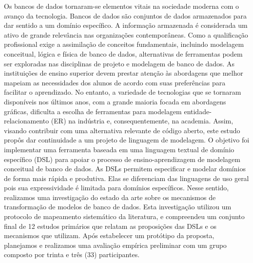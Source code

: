 \begin{resumo}[Resumo]
Os bancos de dados tornaram-se elementos vitais na sociedade moderna com o avanço da tecnologia.
Bancos de dados são conjuntos de dados armazenados para dar sentido a um domínio específico.
A informação armazenada é considerada um ativo de grande relevância nas organizações contemporâneas.
Como a qualificação profissional exige a assimilação de conceitos fundamentais, incluindo modelagem conceitual, lógica e física de banco de dados, alternativas de ferramentas podem ser exploradas nas disciplinas de projeto e modelagem de banco de dados.
As instituições de ensino superior devem prestar atenção às abordagens que melhor mapeiam as necessidades dos alunos de acordo com suas preferências para facilitar o aprendizado.
No entanto, a variedade de tecnologias que se tornaram disponíveis nos últimos anos, com a grande maioria focada em abordagens gráficas, dificulta a escolha de ferramentas para modelagem entidade-relacionamento (ER) na indústria e, consequentemente, na academia.
Assim, visando contribuir com uma alternativa relevante de código aberto, este estudo propôs dar continuidade a um projeto de linguagem de modelagem.
O objetivo foi implementar uma ferramenta baseada em uma linguagem textual de domínio específico (DSL) para apoiar o processo de ensino-aprendizagem de modelagem conceitual de banco de dados.
As DSLs permitem especificar e modelar domínios de forma mais rápida e produtiva. Elas se diferenciam das linguagens de uso geral pois sua expressividade é limitada para domínios específicos.
Nesse sentido, realizamos uma investigação do estado da arte sobre os mecanismos de transformação de modelos de banco de dados.
Esta investigação utilizou um protocolo de mapeamento sistemático da literatura, e compreendeu um conjunto final de 12 estudos primários que relatam as proposições das DSLs e os mecanismos que utilizam.
Após estabelecer um protótipo da proposta, planejamos e realizamos uma avaliação empírica preliminar com um grupo composto por trinta e três (33) participantes.

\end{resumo}
